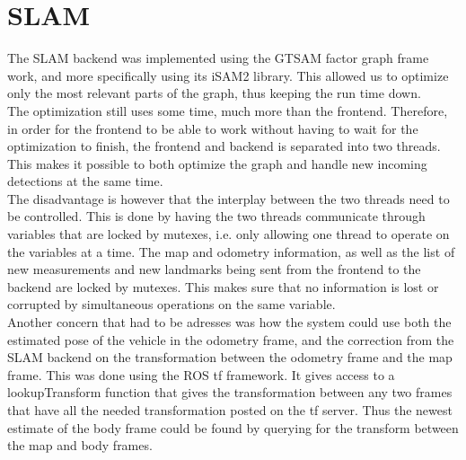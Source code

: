 \section{SLAM}

The SLAM backend was implemented using the GTSAM factor graph frame work\cite{GTSAM}, and more specifically using its iSAM2\cite{iSAM2} library. This allowed us to optimize only the most relevant parts of the graph, thus keeping the run time down. \\

The optimization still uses some time, much more than the frontend. Therefore, in order for the frontend to be able to work without having to wait for the optimization to finish, the frontend and backend is separated into two threads. This makes it possible to both optimize the graph and handle new incoming detections at the same time. \\

The disadvantage is however that the interplay between the two threads need to be controlled. This is done by having the two threads communicate through variables that are locked by mutexes, i.e. only allowing one thread to operate on the variables at a time. The map and odometry information, as well as the list of new measurements and new landmarks being sent from the frontend to the backend are locked by mutexes. This makes sure that no information is lost or corrupted by simultaneous operations on the same variable. \\

Another concern that had to be adresses was how the system could use both the estimated pose of the vehicle in the odometry frame, and the correction from the SLAM backend on the transformation between the odometry frame and the map frame. This was done using the ROS tf framework. It gives access to a lookupTransform function that gives the transformation between any two frames that have all the needed transformation posted on the tf server. Thus the newest estimate of the body frame could be found by querying for the transform between the map and body frames. 